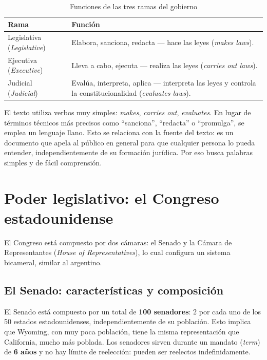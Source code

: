 \documentclass[12pt,oneside]{book}
\begin{document}
\begin{table}[H]
\centering
\caption{Funciones de las tres ramas del gobierno}
\begin{tabularx}{\textwidth}{
    >{\raggedright\arraybackslash}p{}
    >{\raggedright\arraybackslash}X
}
\toprule
\textbf{Rama} & \textbf{Función} \\
\midrule
Legislativa (\textit{Legislative}) & Elabora, sanciona, redacta — hace las leyes (\textit{makes laws}). \\
Ejecutiva (\textit{Executive}) & Lleva a cabo, ejecuta — realiza las leyes (\textit{carries out laws}). \\
Judicial (\textit{Judicial}) & Evalúa, interpreta, aplica — interpreta las leyes y controla la constitucionalidad (\textit{evaluates laws}). \\
\bottomrule
\end{tabularx}
\end{table}

\begin{note}
El texto utiliza verbos muy simples: \textit{makes}, \textit{carries out}, \textit{evaluates}. En lugar de términos técnicos más precisos como ``sanciona'', ``redacta'' o ``promulga'', se emplea un lenguaje llano. Esto se relaciona con la fuente del texto: es un documento que apela al público en general para que cualquier persona lo pueda entender, independientemente de su formación jurídica. Por eso busca palabras simples y de fácil comprensión.
\end{note}

\chapter{Poder legislativo: el Congreso estadounidense}

El Congreso está compuesto por dos cámaras: el Senado y la Cámara de Representantes (\textit{House of Representatives}), lo cual configura un sistema bicameral, similar al argentino.

\section{El Senado: características y composición}

El Senado está compuesto por un total de \textbf{100 senadores}: 2 por cada uno de los 50 estados estadounidenses, independientemente de su población. Esto implica que Wyoming, con muy poca población, tiene la misma representación que California, mucho más poblada. Los senadores sirven durante un mandato (\textit{term}) de \textbf{6 años} y no hay límite de reelección: pueden ser reelectos indefinidamente.
\end{document}

